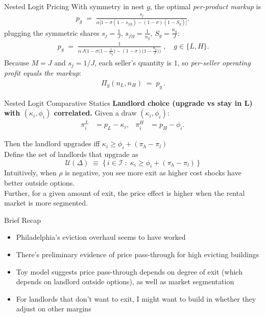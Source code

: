 \documentclass[10pt, xcolor=dvipsnames]{beamer}
\begin{document}
\begin{frame}{Nested Logit Pricing}
    With symmetry in nest $g$, the optimal \emph{per-product markup} is
        \begin{align*}
            p_g \;=\; \frac{s_j}{\alpha\big[1 - \sigma(1-s_{j|g}) - (1-\sigma)(1-S_g)\big]}.
        \end{align*}
plugging the symmetric shares $s_j=\tfrac{1}{J}$, $s_{j|g}=\tfrac{1}{n_g}$, $S_g=\tfrac{n_g}{J}$:
\begin{align*}
\boxed{
\,p_g 
\;=\;
\frac{1}{\alpha\,J\Big(1 - \sigma\!\big(1-\tfrac{1}{n_g}\big) - (1-\sigma)\!\big(1-\tfrac{n_g}{J}\big)\Big)}\;,\quad g\in\{L,H\}.
}
\end{align*}
Because $M=J$ and $s_j=1/J$, each seller’s quantity is $1$, so \emph{per-seller operating profit equals the markup}:
\begin{align*}
    \boxed{\,\Pi_g(n_L,n_H) \;=\; p_g \,}.
\end{align*}
    
\end{frame}

\begin{frame}{Nested Logit Comparative Statics}
    \textbf{Landlord choice (upgrade vs stay in L) with $(\kappa_i,\phi_i)$ correlated.}
Given a draw $(\kappa_i,\phi_i)$:
\begin{align*}
\pi_i^{L} &= p_L - \kappa_i, 
&
\pi_i^{H} &= p_H-\phi_i.
\end{align*}

Then the landlord upgrades iff $\kappa_i \geq \phi_i + (\pi_h - \pi_l)$\\
Define the set of landlords that upgrade as \[
\mathcal{U}(\Delta)\;\equiv\;\big\{\, i \in \mathcal{I}\;:\; \kappa_i \geq \phi_i+ (\pi_h - \pi_l) \,\big\}
\]
\pause
Intuitively, when $\rho$ is negative, you see more exit as higher cost shocks have better outside options. \\

Further, for a given amount of exit, the price effect is higher when the rental market is more segmented.

\end{frame}

\begin{frame}{Brief Recap}
    \begin{itemize}
        \item Philadelphia's eviction overhaul seems to have worked
        \pause
        \item There's preliminary evidence of price pass-through for high evicting buildings
        \pause
        \item Toy model suggests price pass-through depends on degree of exit (which depends on landlord outside options), as well as market segmentation
        \pause
        \item For landlords that don't want to exit, I might want to build in whether they adjust on other margins
    \end{itemize}
    
\end{frame}
\end{document}

